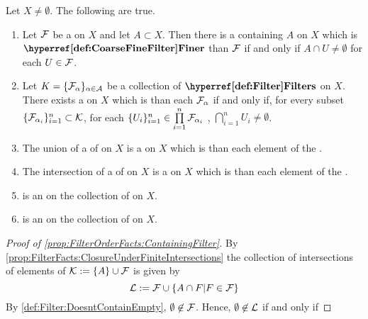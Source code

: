 \begin{prop}
    \label{prop:FilterOrderFacts}
    Let $X \neq \emptyset$. The following are true. 
    \begin{enumerate}[label=(\roman*), ref={\ref{prop:FilterOrderFacts}.~\roman*}]
    \item \label{prop:FilterOrderFacts:ContainingFilter} Let $\mathcal{F}$ be a \Filter on $X$ and let $A \subset X$. Then there is a \Filter containing $A$ on $X$ which is $\FinerFilter$ than $\mathcal{F}$ if and only if $A \cap U \neq \emptyset$ for each $U \in \mathcal{F}$. 
    \item \label{prop:FilterOrderFacts:FinestFilterExistence}
    Let $\sc{K}=\{\mathcal{F}_\alpha\}_{\alpha \in A}$ be a collection of $\Filters$ on $X$. 
    There exists a \Filter on $X$ which is \FinerFilter than each $\mathcal{F}_\alpha$ if and only if, for every \Finite subset $\{\mathcal{F}_{\alpha_i}\}_{i=1}^n \subset \mathcal{K}$, 
    for each $\{U_i\}_{i=1}^n \in \prod\limits_{i=1}^n \mathcal{F}_{\alpha_i}$
    , $\bigcap\limits_{i=1}^n U_i \neq \emptyset$.
    \item \label{prop:FilterOrderFacts:UnionOfChainOfFiltersIsAFilter}
        The union of a \Chain of \Filters on $X$ is a \Filter on $X$ which is \FinerFilter
        than each element of the \Chain.
    \item \label{prop:FilterOrderFacts:IntersectionOfChainOfFiltersIsAFilter}
        The intersection of a \Chain of \Filters on $X$ is a \Filter on $X$ which is 
        \CoarserFilter than each element of the \Chain.
    \item \label{prop:FilterOrderFacts:FilterFinenessIsInductive}
        \FilterFineness is an \InductiveOrder on the collection of \Filters on $X$. 
    \item \label{prop:FilterOrderFacts:FilterCoarsenessIsInductive}
        \FilterCoarseness is an \InductiveOrder on the collection of \Filters on $X$. 
    \end{enumerate}
    \begin{proof}[Proof of \ref{prop:FilterOrderFacts:ContainingFilter}]
        By 
        \ref{prop:FilterFacts:ClosureUnderFiniteIntersections} 
        the collection of 
        \Finite intersections of elements of $\mathcal{K} := \{A\} \cup \mathcal{F}$ is given by 
        \begin{equation*}
            \mathcal{L}:=\mathcal{F} \cup \{ A \cap F | F \in \mathcal{F}\}
        \end{equation*}
        By \ref{def:Filter:DoesntContainEmpty}, $\emptyset \not \in \mathcal{F}$. 
        Hence, $\emptyset \not \in \mathcal{L}$ if and only if 

\end{proof}
\end{prop}
